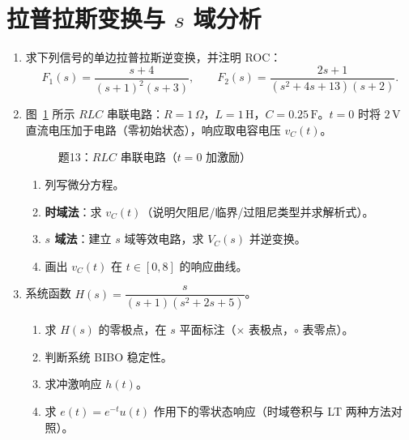 \documentclass[11pt,a4paper]{ctexart}
\begin{document}
\section{拉普拉斯变换与 $s$ 域分析}

\begin{enumerate}[label=\textbf{题\arabic*.},leftmargin=*,itemsep=1.2em,start=12]

\item \label{q:12}
求下列信号的单边拉普拉斯逆变换，并注明 ROC：
\[
F_1(s)=\frac{s+4}{(s+1)^2(s+3)},\qquad
F_2(s)=\frac{2s+1}{(s^2+4s+13)(s+2)}.
\]

\item \label{q:13}
图~\ref{fig:q13-rlc} 所示 $RLC$ 串联电路：$R=1\,\Omega$，$L=1\,\mathrm{H}$，$C=0.25\,\mathrm{F}$。$t=0$ 时将 $2\,\mathrm{V}$ 直流电压加于电路（零初始状态），响应取电容电压 $v_C(t)$。
\begin{figure}[htbp]
\centering
{}
\caption{题13：$RLC$ 串联电路（$t=0$ 加激励）}
\label{fig:q13-rlc}
\end{figure}
\begin{enumerate}[label=(\alph*)]
    \item 列写微分方程。
    \item \textbf{时域法}：求 $v_C(t)$（说明欠阻尼/临界/过阻尼类型并求解析式）。
    \item \textbf{$s$ 域法}：建立 $s$ 域等效电路，求 $V_C(s)$ 并逆变换。
    \item 画出 $v_C(t)$ 在 $t\in[0,8]$ 的响应曲线。
\end{enumerate}

\item \label{q:14}
系统函数 $H(s)=\dfrac{s}{(s+1)(s^2+2s+5)}$。
\begin{enumerate}[label=(\alph*)]
    \item 求 $H(s)$ 的零极点，在 $s$ 平面标注（$\times$ 表极点，$\circ$ 表零点）。
    \item 判断系统 BIBO 稳定性。
    \item 求冲激响应 $h(t)$。
    \item 求 $e(t)=e^{-t}u(t)$ 作用下的零状态响应（时域卷积与 LT 两种方法对照）。
\end{enumerate}


\end{enumerate}
\end{document}

